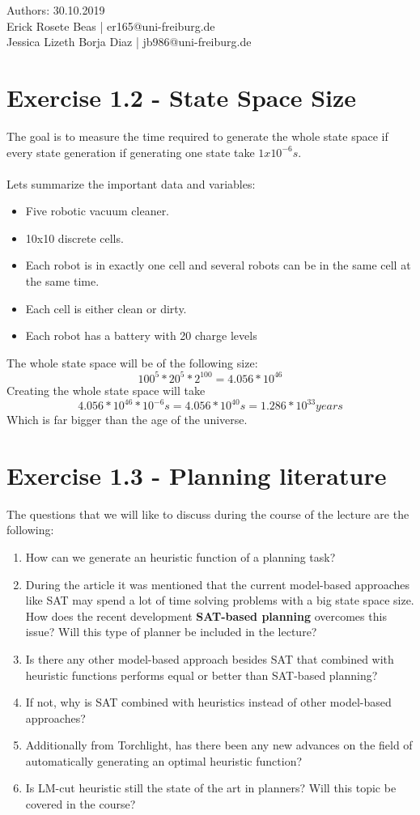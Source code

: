 \documentclass[12pt,a4paper]{article}
\begin{document}
	\begin{flushleft}
		Authors: \hfill 30.10.2019\\
		Erick Rosete Beas | er165@uni-freiburg.de\\
		Jessica Lizeth Borja Diaz | jb986@uni-freiburg.de\\
	\end{flushleft}
	\section*{Exercise 1.2 - State Space Size}
	The goal is to measure the time required to generate the whole state space if every state generation if generating one state
	take $1x10^{-6} s$.\\\\
	Lets summarize the important data and variables:
	\begin{itemize}[noitemsep]
		\item Five robotic vacuum cleaner.
		\item 10x10 discrete cells.
		\item Each robot is in exactly one cell and several robots can be in the same cell at the same time.
		\item Each cell is either clean or dirty.
		\item Each robot has a battery with 20 charge levels
	\end{itemize}
	The whole state space will be of the following size:
	\[100^{5}*20^{5}*2^{100} = 4.056*10^{46}\]
	Creating the whole state space will take
	\[4.056*10^{46}*10^{-6}s = 4.056*10^{40} s = 1.286*10^{33} years\]
	Which is far bigger than the age of the universe.
	
	
	\section*{Exercise 1.3 - Planning literature}
	The questions that we will like to discuss during the course of the lecture are the following:
	\begin{enumerate}
		\item How can we generate an heuristic function of a planning task?
		\item During the article it was mentioned that the current model-based approaches like SAT may spend a lot of time solving problems with a big state space size. How does the recent development \textbf{SAT-based planning} overcomes this issue? Will this type of planner be included in the lecture?
		\item Is there any other model-based approach besides SAT that combined with heuristic functions performs equal or better than SAT-based planning?
		\item If not, why is SAT combined with heuristics instead of other model-based approaches?
		\item Additionally from Torchlight, has there been any new advances on the field of automatically generating an optimal heuristic function?
		\item Is LM-cut heuristic still the state of the art in planners? Will this topic be covered in the course?
	\end{enumerate}

	
\end{document}
